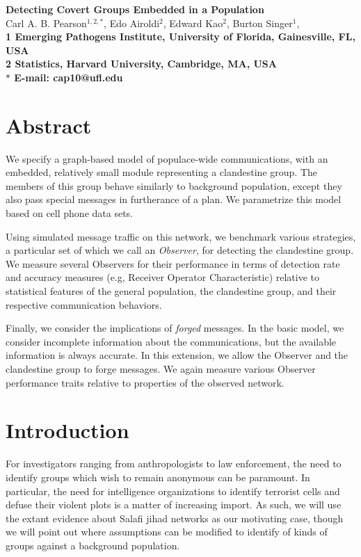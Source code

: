 \documentclass{article}
\begin{document}
\begin{flushleft}
{\Large
\textbf{Detecting Covert Groups Embedded in a Population}
}
\\
Carl A. B. Pearson$^{1,2,\ast}$, 
Edo Airoldi$^{2}$, 
Edward Kao$^{2}$,
Burton Singer$^{1}$, 
\\
\bf{1} Emerging Pathogens Institute, University of Florida, Gainesville, FL, USA
\\
\bf{2} Statistics, Harvard University, Cambridge, MA, USA
\\
$\ast$ E-mail: cap10@ufl.edu
\end{flushleft}
\section*{Abstract}
We specify a graph-based model of populace-wide communications, with an embedded, relatively small module representing a clandestine group.  The members of this group behave similarly to background population, except they also pass special messages in furtherance of a plan.  We parametrize this model based on cell phone data sets.

Using simulated message traffic on this network, we benchmark various strategies, a particular set of which we call an {\em Observer}, for detecting the clandestine group.  We measure several Observers for their performance in terms of detection rate and accuracy measures (e.g, Receiver Operator Characteristic) relative to statistical features of the general population, the clandestine group, and their respective communication behaviors.

Finally, we consider the implications of {\em forged} messages.  In the basic model, we consider incomplete information about the communications, but the available information is always accurate.  In this extension, we allow the Observer and the clandestine group to forge messages.  We again measure various Observer performance traits relative to properties of the observed network.

\section*{Introduction}
For investigators ranging from anthropologists to law enforcement, the need to identify groups which wish to remain anonymous can be paramount.  In particular, the need for intelligence organizations to identify terrorist cells and defuse their violent plots is a matter of increasing import.  As such, we will use the extant evidence about Salafi jihad networks as our motivating case\cite{sageman}, though we will point out where assumptions can be modified to identify of kinds of groups against a background population. 
\end{document}
